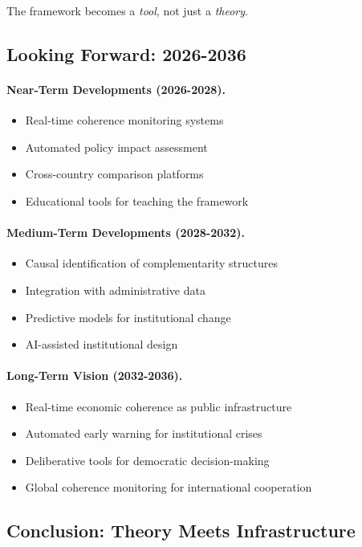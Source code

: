 The framework becomes a \emph{tool}, not just a \emph{theory}.

\subsection{Looking Forward: 2026-2036}

\paragraph{Near-Term Developments (2026-2028).}
\begin{itemize}
  \item Real-time coherence monitoring systems
  \item Automated policy impact assessment
  \item Cross-country comparison platforms
  \item Educational tools for teaching the framework
\end{itemize}

\paragraph{Medium-Term Developments (2028-2032).}
\begin{itemize}
  \item Causal identification of complementarity structures
  \item Integration with administrative data
  \item Predictive models for institutional change
  \item AI-assisted institutional design
\end{itemize}

\paragraph{Long-Term Vision (2032-2036).}
\begin{itemize}
  \item Real-time economic coherence as public infrastructure
  \item Automated early warning for institutional crises
  \item Deliberative tools for democratic decision-making
  \item Global coherence monitoring for international cooperation
\end{itemize}

\subsection{Conclusion: Theory Meets Infrastructure}

